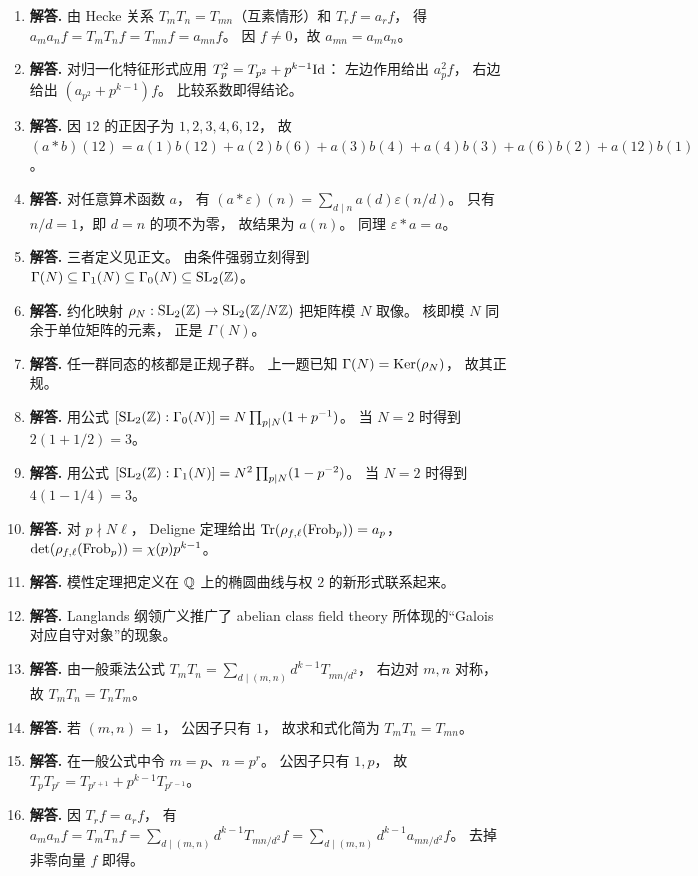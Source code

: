 \begin{enumerate}[label=\textbf{\arabic*.}, leftmargin=*, itemsep=1em]
\item \textbf{解答.} 由 Hecke 关系 $T_mT_n=T_{mn}$（互素情形）和 $T_rf=a_rf$， 得 $a_ma_nf=T_mT_nf=T_{mn}f=a_{mn}f$。 因 $f\ne 0$，故 $a_{mn}=a_ma_n$。
\item \textbf{解答.} 对归一化特征形式应用 $T_p^2=T_{p^2}+p^{k-1}\mathrm{Id}$： 左边作用给出 $a_p^2f$， 右边给出 $(a_{p^2}+p^{k-1})f$。 比较系数即得结论。
\item \textbf{解答.} 因 $12$ 的正因子为 $1,2,3,4,6,12$， 故 $(a*b)(12)=a(1)b(12)+a(2)b(6)+a(3)b(4)+a(4)b(3)+a(6)b(2)+a(12)b(1)$。
\item \textbf{解答.} 对任意算术函数 $a$， 有 $(a*\varepsilon)(n)=\sum_{d\mid n}a(d)\varepsilon(n/d)$。 只有 $n/d=1$，即 $d=n$ 的项不为零， 故结果为 $a(n)$。 同理 $\varepsilon*a=a$。
\item \textbf{解答.} 三者定义见正文。 由条件强弱立刻得到 $\Gamma(N)\subseteq \Gamma_1(N)\subseteq \Gamma_0(N)\subseteq \mathrm{SL}_2(\mathbb{Z})$。
\item \textbf{解答.} 约化映射 $\rho_N:\mathrm{SL}_2(\mathbb{Z})\to \mathrm{SL}_2(\mathbb{Z}/N\mathbb{Z})$ 把矩阵模 $N$ 取像。 核即模 $N$ 同余于单位矩阵的元素， 正是 $\Gamma(N)$。
\item \textbf{解答.} 任一群同态的核都是正规子群。 上一题已知 $\Gamma(N)=\mathrm{Ker}(\rho_N)$， 故其正规。
\item \textbf{解答.} 用公式 $[\mathrm{SL}_2(\mathbb{Z}):\Gamma_0(N)]=N\prod_{p\mid N}(1+p^{-1})$。 当 $N=2$ 时得到 $2(1+1/2)=3$。
\item \textbf{解答.} 用公式 $[\mathrm{SL}_2(\mathbb{Z}):\Gamma_1(N)]=N^2\prod_{p\mid N}(1-p^{-2})$。 当 $N=2$ 时得到 $4(1-1/4)=3$。
\item \textbf{解答.} 对 $p\nmid N\ell$， Deligne 定理给出 $\mathrm{Tr}(\rho_{f,\ell}(\mathrm{Frob}_p))=a_p$， $\det(\rho_{f,\ell}(\mathrm{Frob}_p))=\chi(p)p^{k-1}$。
\item \textbf{解答.} 模性定理把定义在 $\mathbb{Q}$ 上的椭圆曲线与权 $2$ 的新形式联系起来。
\item \textbf{解答.} Langlands 纲领广义推广了 abelian class field theory 所体现的“Galois 对应自守对象”的现象。
\item \textbf{解答.} 由一般乘法公式 $T_mT_n=\sum_{d\mid(m,n)}d^{k-1}T_{mn/d^2}$， 右边对 $m,n$ 对称， 故 $T_mT_n=T_nT_m$。
\item \textbf{解答.} 若 $(m,n)=1$， 公因子只有 $1$， 故求和式化简为 $T_mT_n=T_{mn}$。
\item \textbf{解答.} 在一般公式中令 $m=p$、$n=p^r$。 公因子只有 $1,p$， 故 $T_pT_{p^r}=T_{p^{r+1}}+p^{k-1}T_{p^{r-1}}$。
\item \textbf{解答.} 因 $T_rf=a_rf$， 有 $a_ma_nf=T_mT_nf= \sum_{d\mid(m,n)}d^{k-1}T_{mn/d^2}f= \sum_{d\mid(m,n)}d^{k-1}a_{mn/d^2}f$。 去掉非零向量 $f$ 即得。

\end{enumerate}
